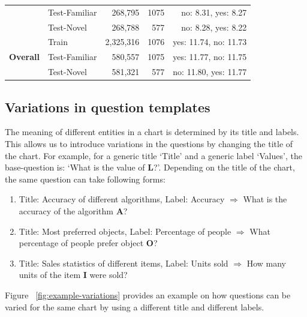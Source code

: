 \documentclass[10pt,twocolumn,letterpaper]{article}
\begin{document}
\begin{appendices}
\begin{table}[t]
\begin{tabular}{@{}llrrr@{}}
                           & Test-Familiar & 268,795                                                            & 1075       & no: 8.31, yes: 8.27                                                   \\
                           & Test-Novel    & 268,788                                                             & 577          &no: 8.28, yes: 8.22                                        \\ \midrule
\multirow{3}{*}{\textbf{Overall}} & Train         & 2,325,316                                                             & 1076        & yes: 11.74, no: 11.73                                                    \\
                           & Test-Familiar & 580,557                                                             & 1075         & yes: 11.77, no: 11.75                                               \\ & Test-Novel    & 581,321   & 577         & no: 11.80, yes: 11.77 

\\ \bottomrule
\end{tabular}
\end{table}

\subsection{Variations in question templates}
The meaning of different entities in a chart is determined by its title and labels. This allows us to introduce variations in the questions by changing the title of the chart. For example, for a generic title `Title' and a generic label `Values', the base-question is: `What is the value of \textbf{L}?'. Depending on the title of the chart, the same question can take following forms:
\begin{enumerate}
\item Title: Accuracy of different algorithms, Label: Accuracy $\Rightarrow$ What is the accuracy of the algorithm \textbf{A}?
\item Title: Most preferred objects, Label: Percentage of people $\Rightarrow$  What percentage of people prefer object \textbf{O}?
\item Title: Sales statistics of different items, Label: Units sold $\Rightarrow$  How many units of the item \textbf{I} were sold?
\end{enumerate}

Figure ~\ref{fig:example-variations} provides an example on how questions can be varied for the same chart by using a different title and different labels.

\end{appendices}
\end{document}
